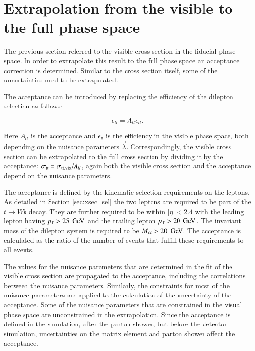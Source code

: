 \section{Extrapolation from the visible to the full phase space}
\label{sec:xsec_extraction}

The previous section referred to the visible cross section in the fiducial phase space. In order to extrapolate this result to the full phase space an acceptance correction 
is determined.
Similar to the cross section itself, some of the uncertainties need to be extrapolated.

The acceptance can be introduced by replacing the efficiency of the dilepton selection as follows:

\begin{equation}
\epsilon_{ll} = A_{ll} \epsilon_{ll}.
\label{eq:epsacc}
\end{equation}

Here $A_{ll}$ is the acceptance and $\epsilon_{ll}$ is the efficiency in the visible phase space, both depending on the nuisance parameters $\vec{\lambda}$.
Correspondingly, the visible cross section can be extrapolated to the full cross section by dividing it by the acceptance: $\sigma_{\mathrm{t}\bar{\mathrm{t}}} = \sigma_{\mathrm{t}\bar{\mathrm{t}},\mathrm{vis}} / A_{ll}$, again both the visible cross section and the 
acceptance depend on the nuisance parameters.

The acceptance is defined by the kinematic selection requirements on the leptons. As detailed in Section \ref{sec:xsec_sel} the two leptons are required to be part of the $t \rightarrow W b$ decay. They are further required to be within $|\eta|< 2.4$ with the 
leading lepton having $p_{\mathrm{T}} > 25 \; \,\text{Ge\hspace{-.08em}V}$ and the trailing lepton $p_{\mathrm{T}} > 20 \; \,\text{Ge\hspace{-.08em}V}$. The invariant mass of the dilepton system is required to be $M_{\ell\ell} > 20 \; \,\text{Ge\hspace{-.08em}V}$. The acceptance is calculated as the ratio of the number of \ttbar events that fulfill these requirements to all \ttbar events.

The values for the nuisance parameters that are determined in the fit of the visible cross section are propagated to the acceptance, including the correlations between the nuisance parameters. 
Similarly, the constraints for most of the nuisance parameters are applied to the calculation of the uncertainty of the acceptance.
Some of the nuisance parameters that are constrained in the visual phase space are unconstrained in the extrapolation.
Since the acceptance is defined in the simulation, after the parton shower, but before the detector simulation, uncertainties on the 
matrix element and parton shower affect the acceptance.

